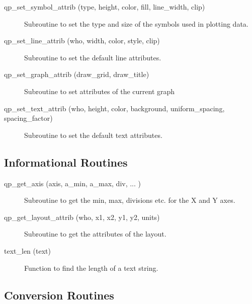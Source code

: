 \begin{description}
\item[qp\_set\_symbol\_attrib (type, height, color, fill, line\_width, clip)] \Newline 
     Subroutine to set the type and size of the symbols used in plotting data.

\item[qp\_set\_line\_attrib (who, width, color, style, clip)] \Newline 
     Subroutine to set the default line attributes.

\item[qp\_set\_graph\_attrib (draw\_grid, draw\_title)] \Newline 
     Subroutine to set attributes of the current graph

\item[qp\_set\_text\_attrib (who, height, color, background, 
                                uniform\_spacing, spacing\_factor) ] \Newline 
     Subroutine to set the default text attributes.

\end{description}

\subsection{Informational Routines}

\begin{description}

\item[qp\_get\_axis (axis, a\_min, a\_max, div, ... ) ] \Newline
     Subroutine to get the min, max, divisions etc. for the X and Y axes.

\item[qp\_get\_layout\_attrib (who, x1, x2, y1, y2, units)] \Newline 
     Subroutine to get the attributes of the layout.

\item[text\_len (text)] \Newline 
     Function to find the length of a text string.

\end{description}

\subsection{Conversion Routines}

